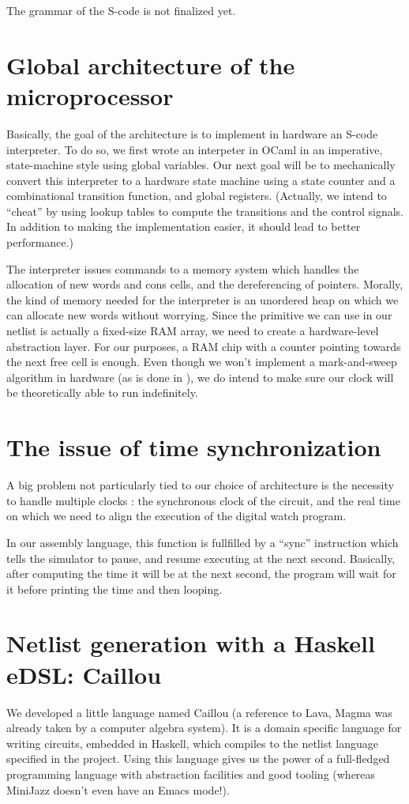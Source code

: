 \documentclass[a4paper, 11pt]{article}
\begin{document}
The grammar of the S-code is not finalized yet.


\section{Global architecture of the microprocessor}

Basically, the goal of the architecture is to implement in hardware an S-code interpreter. To do so, we first wrote an interpeter in OCaml in an imperative, state-machine style using global variables. Our next goal will be to mechanically convert this interpreter to a hardware state machine using a state counter and a combinational transition function, and global registers. (Actually, we intend to \enquote{cheat} by using lookup tables to compute the transitions and the control signals. In addition to making the implementation easier, it should lead to better performance.)

The interpreter issues commands to a memory system which handles the allocation of new words and cons cells, and the dereferencing of pointers. Morally, the kind of memory needed for the interpreter is an unordered heap on which we can allocate new words without worrying. Since the primitive we can use in our netlist is actually a fixed-size RAM array, we need to create a hardware-level abstraction layer. For our purposes, a RAM chip with a counter pointing towards the next free cell is enough. Even though we won't implement a mark-and-sweep algorithm in hardware (as is done in \cite{SCHEME-79}), we do intend to make sure our clock will be theoretically able to run indefinitely.


\section{The issue of time synchronization}

A big problem not particularly tied to our choice of architecture is the necessity to handle multiple clocks : the synchronous clock of the circuit, and the real time on which we need to align the execution of the digital watch program.

In our assembly language, this function is fullfilled by a \enquote{sync} instruction which tells the simulator to pause, and resume executing at the next second. Basically, after computing the time it will be at the next second, the program will wait for it before printing the time and then looping.


\section{Netlist generation with a Haskell eDSL: Caillou }

We developed a little language named Caillou (a reference to Lava, Magma was already taken by a computer algebra system). It is a domain specific language for writing circuits, embedded in Haskell, which compiles to the netlist language specified in the project. Using this language gives us the power of a full-fledged programming language with abstraction facilities and good tooling (whereas MiniJazz doesn't even have an Emacs mode!).




\end{document}
